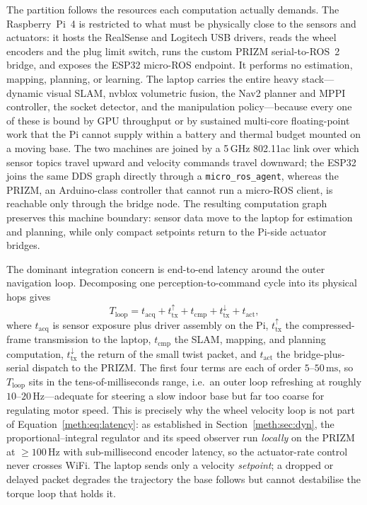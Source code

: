 The partition follows the resources each computation actually demands. The Raspberry~Pi~4 is restricted to what must be physically close to the sensors and actuators: it hosts the RealSense and Logitech USB drivers, reads the wheel encoders and the plug limit switch, runs the custom PRIZM serial-to-ROS~2 bridge, and exposes the ESP32 micro-ROS endpoint. It performs no estimation, mapping, planning, or learning. The laptop carries the entire heavy stack---dynamic visual SLAM, nvblox volumetric fusion, the Nav2 planner and MPPI controller, the socket detector, and the manipulation policy---because every one of these is bound by GPU throughput or by sustained multi-core floating-point work that the Pi cannot supply within a battery and thermal budget mounted on a moving base. The two machines are joined by a 5\,\ensuremath{\mathrm{GHz}} 802.11ac link over which sensor topics travel upward and velocity commands travel downward; the ESP32 joins the same DDS graph directly through a \texttt{micro\_ros\_agent}, whereas the PRIZM, an Arduino-class controller that cannot run a micro-ROS client, is reachable only through the bridge node. The resulting computation graph preserves this machine boundary: sensor data move to the laptop for estimation and planning, while only compact setpoints return to the Pi-side actuator bridges.

The dominant integration concern is end-to-end latency around the outer navigation loop. Decomposing one perception-to-command cycle into its physical hops gives
\begin{equation}
T_{\mathrm{loop}}
= t_{\mathrm{acq}}
+ t_{\mathrm{tx}}^{\uparrow}
+ t_{\mathrm{cmp}}
+ t_{\mathrm{tx}}^{\downarrow}
+ t_{\mathrm{act}},
\label{meth:eq:latency}
\end{equation}
where $t_{\mathrm{acq}}$ is sensor exposure plus driver assembly on the Pi, $t_{\mathrm{tx}}^{\uparrow}$ the compressed-frame transmission to the laptop, $t_{\mathrm{cmp}}$ the SLAM, mapping, and planning computation, $t_{\mathrm{tx}}^{\downarrow}$ the return of the small twist packet, and $t_{\mathrm{act}}$ the bridge-plus-serial dispatch to the PRIZM. The first four terms are each of order \ensuremath{5\text{--}50\,\mathrm{ms}}, so $T_{\mathrm{loop}}$ sits in the tens-of-milliseconds range, i.e.\ an outer loop refreshing at roughly \ensuremath{10\text{--}20\,\mathrm{Hz}}---adequate for steering a slow indoor base but far too coarse for regulating motor speed. This is precisely why the wheel velocity loop is not part of Equation~\eqref{meth:eq:latency}: as established in Section~\ref{meth:sec:dyn}, the proportional--integral regulator and its speed observer run \emph{locally} on the PRIZM at $\ge\!\ensuremath{100\,\mathrm{Hz}}$ with sub-millisecond encoder latency, so the actuator-rate control never crosses WiFi. The laptop sends only a velocity \emph{setpoint}; a dropped or delayed packet degrades the trajectory the base follows but cannot destabilise the torque loop that holds it.

